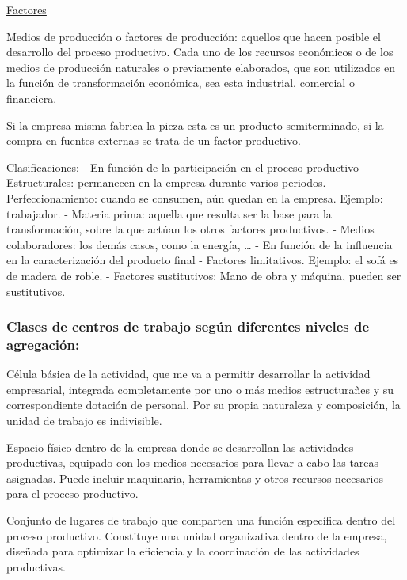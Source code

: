 \documentclass[12pt]{book} %
\begin{document}
\underline{Factores}

Medios de producción o factores de producción: aquellos que hacen
posible el desarrollo del proceso productivo. Cada uno de los recursos
económicos o de los medios de producción naturales o previamente
elaborados, que son utilizados en la función de transformación
económica, sea esta industrial, comercial o financiera.

Si la empresa misma fabrica la pieza esta es un producto semiterminado,
si la compra en fuentes externas se trata de un factor productivo.

Clasificaciones: - En función de la participación en el proceso
productivo - Estructurales: permanecen en la empresa durante varios
periodos. - Perfeccionamiento: cuando se consumen, aún quedan en la
empresa. Ejemplo: trabajador. - Materia prima: aquella que resulta ser
la base para la transformación, sobre la que actúan los otros factores
productivos. - Medios colaboradores: los demás casos, como la energía,
\ldots{} - En función de la influencia en la caracterización del
producto final - Factores limitativos. Ejemplo: el sofá es de madera de
roble. - Factores sustitutivos: Mano de obra y máquina, pueden ser
sustitutivos.

\subsubsection*{Clases de centros de trabajo según diferentes niveles de agregación:}

\begin{definicion}
Célula básica de la actividad, que me va a permitir desarrollar la actividad empresarial, integrada completamente por uno o más medios estructurañes y su correspondiente dotación de personal. Por su propia naturaleza y composición, la unidad de trabajo es indivisible.
\end{definicion}

\begin{definicion}
Espacio físico dentro de la empresa donde se desarrollan las actividades productivas, equipado con los medios necesarios para llevar a cabo las tareas asignadas. Puede incluir maquinaria, herramientas y otros recursos necesarios para el proceso productivo.
\end{definicion}

\begin{definicion}
Conjunto de lugares de trabajo que comparten una función específica dentro del proceso productivo. Constituye una unidad organizativa dentro de la empresa, diseñada para optimizar la eficiencia y la coordinación de las actividades productivas.
\end{definicion}
\end{document}

